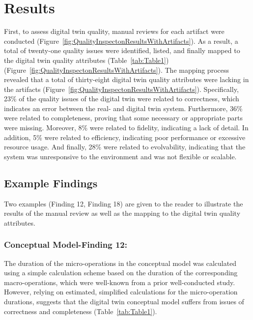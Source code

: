 \documentclass{llncs}
\begin{document}
    \section{Results}
    First, to assess digital twin quality, manual reviews for each artifact were conducted (Figure~\ref{fig:QualityInspectonResultsWithArtifacts}). 
    As a result, a total of twenty-one quality issues were identified, listed, and finally mapped to the digital twin quality attributes (Table~\ref{tab:Table1}) (Figure~\ref{fig:QualityInspectonResultsWithArtifacts}).
    The mapping process revealed that a total of thirty-eight digital twin quality attributes were lacking in the artifacts (Figure~\ref{fig:QualityInspectonResultsWithArtifacts}).  
    Specifically, 23\% of the quality issues of the digital twin were related to correctness, which indicates an error between the real- and digital twin system. Furthermore, 36\%  were related 
    to completeness, proving that some necessary or appropriate parts were missing.
    Moreover, 8\%  were related to fidelity, indicating a lack of detail. 
    In addition, 5\%  were related to efficiency, indicating poor performance or excessive resource usage.
    And finally, 28\% were related to evolvability, indicating that the system was unresponsive 
    to the environment and was not flexible or scalable.
    \subsection{Example Findings}  
    Two examples (Finding 12, Finding 18) are given to the reader to illustrate 
    the results of the manual review as well as the mapping to the digital twin quality attributes. 
    \subsubsection{Conceptual Model-Finding 12:}
    The duration of the micro-operations in the conceptual model was calculated using a simple calculation 
    scheme based on the duration of the corresponding macro-operations,
     which were well-known from a prior well-conducted study. 
    However, relying on estimated, 
    simplified calculations for the micro-operation durations,
    suggests that the digital twin conceptual model suffers from issues of correctness and completeness (Table~\ref{tab:Table1}). 
\end{document}
